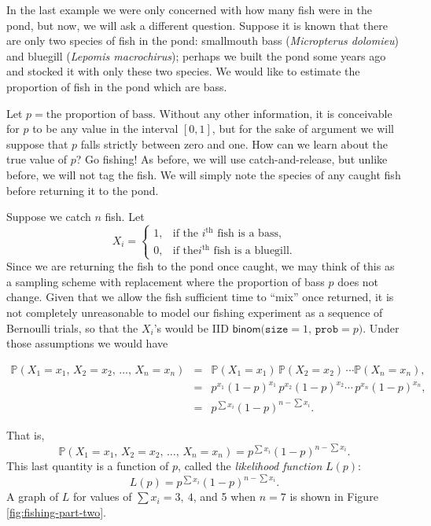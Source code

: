 \documentclass[]{book}
\numberwithin{equation}{chapter}
\numberwithin{figure}{chapter}
\theoremstyle{plain}
\theoremstyle{definition}
\theoremstyle{remark}
\theoremstyle{definition}
\theoremstyle{definition}
\theoremstyle{remark}
\let\BeginKnitrBlock\begin \let\EndKnitrBlock\end
\begin{document}
\bigskip

\BeginKnitrBlock{example}[Fishing, part two]
\protect\hypertarget{ex:bass-bluegill}{}{\label{ex:bass-bluegill}
\iffalse (Fishing, part two) \fi }In the last example we were only
concerned with how many fish were in the pond, but now, we will ask a
different question. Suppose it is known that there are only two species
of fish in the pond: smallmouth bass (\emph{Micropterus dolomieu}) and
bluegill (\emph{Lepomis macrochirus}); perhaps we built the pond some
years ago and stocked it with only these two species. We would like to
estimate the proportion of fish in the pond which are bass.
\EndKnitrBlock{example}

Let \(p=\mbox{the proportion of bass}\). Without any other information,
it is conceivable for \(p\) to be any value in the interval \([0,1]\),
but for the sake of argument we will suppose that \(p\) falls strictly
between zero and one. How can we learn about the true value of \(p\)? Go
fishing! As before, we will use catch-and-release, but unlike before, we
will not tag the fish. We will simply note the species of any caught
fish before returning it to the pond.

Suppose we catch \(n\) fish. Let \[ X_{i} = \begin{cases} 1, &
\mbox{if the \(i^{\text{th}}\) fish is a bass,}\\ 0, & \mbox{if the
\(i^{\text{th}}\) fish is a bluegill.} \end{cases} \] Since we are
returning the fish to the pond once caught, we may think of this as a
sampling scheme with replacement where the proportion of bass \(p\) does
not change. Given that we allow the fish sufficient time to ``mix'' once
returned, it is not completely unreasonable to model our fishing
experiment as a sequence of Bernoulli trials, so that the \(X_{i}\)'s
would be IID \(\mathsf{binom(\mathtt{size}}=1,\,\mathtt{prob}=p)\).
Under those assumptions we would have

\begin{eqnarray*}
\mathbb{P}(X_{1}=x_{1},\, X_{2}=x_{2},\,\ldots,\, X_{n}=x_{n}) & = & \mathbb{P}(X_{1}=x_{1})\,\mathbb{P}(X_{2}=x_{2})\,\cdots\mathbb{P}(X_{n}=x_{n}),\\
 & = & p^{x_{1}}(1-p)^{x_{1}}\, p^{x_{2}}(1-p)^{x_{2}}\cdots\, p^{x_{n}}(1-p)^{x_{n}},\\
 & = & p^{\sum x_{i}}(1-p)^{n-\sum x_{i}}.
\end{eqnarray*}

That is, \[ \mathbb{P}(X_{1}=x_{1},\, X_{2}=x_{2},\,\ldots,\,
X_{n}=x_{n})=p^{\sum x_{i}}(1-p)^{n-\sum x_{i}}.  \] This last quantity
is a function of \(p\), called the \emph{likelihood function} \(L(p)\):
\[ L(p)=p^{\sum x_{i}}(1-p)^{n-\sum x_{i}}.  \] A graph of \(L\) for
values of \(\sum x_{i}=3,\ 4\), and 5 when \(n=7\) is shown in Figure
\ref{fig:fishing-part-two}.
\end{document}

